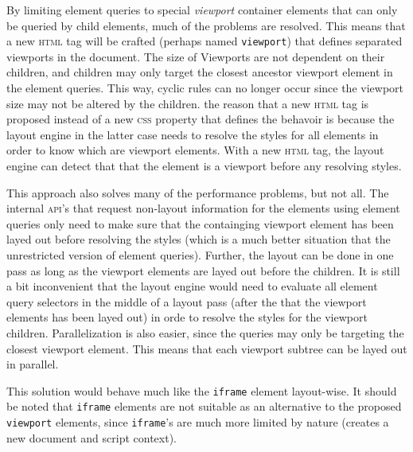 \documentclass[a4paper,11pt]{kth-mag}
\newcommand{\code}[1]{\texttt{#1}}
\begin{document}
          By limiting element queries to special \emph{viewport} container elements that can only be queried by child elements, much of the problems are resolved.
          This means that a new \textsc{html} tag will be crafted (perhaps named \code{viewport}) that defines separated viewports in the document.
          The size of Viewports are not dependent on their children, and children may only target the closest ancestor viewport element in the element queries.
          This way, cyclic rules can no longer occur since the viewport size may not be altered by the children.
          the reason that a new \textsc{html} tag is proposed instead of a new \textsc{css} property that defines the behavoir is because the layout engine in the latter case needs to resolve the styles for all elements in order to know which are viewport elements.
          With a new \textsc{html} tag, the layout engine can detect that that the element is a viewport before any resolving styles.

          This approach also solves many of the performance problems, but not all.
          The internal \textsc{api}'s that request non-layout information for the elements using element queries only need to make sure that the containging viewport element has been layed out before resolving the styles (which is a much better situation that the unrestricted version of element queries).
          Further, the layout can be done in one pass as long as the viewport elements are layed out before the children.
          It is still a bit inconvenient that the layout engine would need to evaluate all element query selectors in the middle of a layout pass (after the that the viewport elements has been layed out) in orde to resolve the styles for the viewport children.
          Parallelization is also easier, since the queries may only be targeting the closest viewport element.
          This means that each viewport subtree can be layed out in parallel.

          This solution would behave much like the \code{iframe} element layout-wise.
          It should be noted that \code{iframe} elements are not suitable as an alternative to the proposed \code{viewport} elements, since \code{iframe}'s are much more limited by nature (creates a new document and script context).
\end{document}
